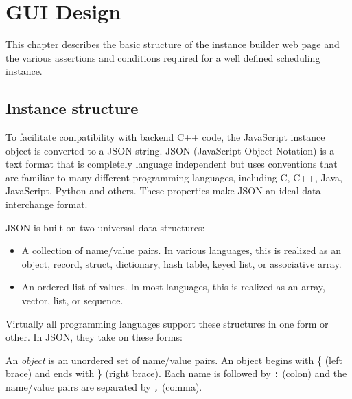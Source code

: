 \chapter{GUI Design}
\thispagestyle{plain}

This chapter describes the basic structure of the instance builder web page and the various assertions and conditions required for a well defined scheduling instance.

\section{Instance structure}
To facilitate compatibility with backend C++ code, the JavaScript instance object is converted to a JSON string. JSON (JavaScript Object Notation) is a text format that is completely language independent but uses conventions that are familiar to many different programming languages, including C, C++, Java, JavaScript, Python and others. These properties make JSON an ideal data-interchange format.

JSON is built on two universal data structures:
\begin{itemize}
\item A collection of name/value pairs. In various languages, this is realized as an object, record, struct, dictionary, hash table, keyed list, or associative array.
\item An ordered list of values. In most languages, this is realized as an array, vector, list, or sequence.
\end{itemize}
Virtually all programming languages support these structures in one form or other. In JSON, they take on these forms:

An \emph{object} is an unordered set of name/value pairs. An object begins with \{ (left brace) and ends with \}  (right brace). Each name is followed by \lstinline{:} (colon) and the name/value pairs are separated by \lstinline{,} (comma).
